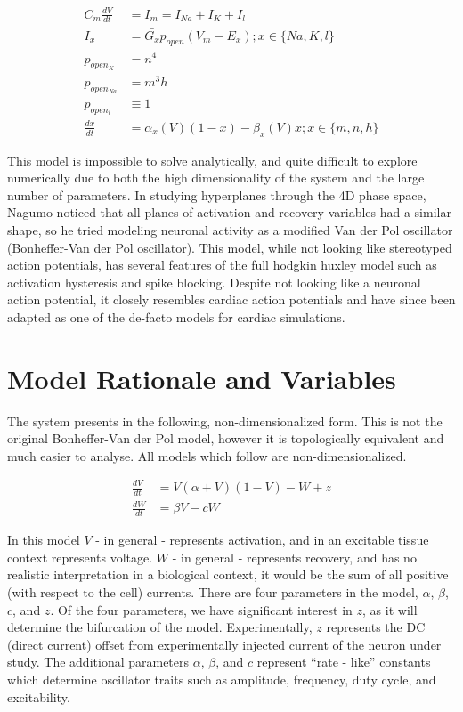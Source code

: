 \documentclass[11pt]{report}
\begin{document}
$$ \begin{aligned} C_m \frac{dV}{dt} &= I_m = I_{Na} + I_{K} + I_l \\ I_x &= \bar{G_x}p_{open}(V_m-E_x); x\in\{Na,K,l\}\\ p_{open_{K}} &= n^4 \\ p_{open_{Na}} &= m^3h\\ p_{open_{l}} &\equiv 1\\ \frac{dx}{dt} &= \alpha_x(V)(1-x)-\beta_x(V)x; x\in \{m,n,h\} \end{aligned} $$

This model is impossible to solve analytically, and quite difficult to explore numerically due to both the high dimensionality of the system and the large number of parameters. In studying hyperplanes through the 4D phase space, Nagumo noticed that all planes of activation and recovery variables had a similar shape, so he tried modeling neuronal activity as a modified Van der Pol oscillator (Bonheffer-Van der Pol oscillator). This model, while not looking like stereotyped action potentials, has several features of the full hodgkin huxley model such as activation hysteresis and spike blocking. Despite not looking like a neuronal action potential, it closely resembles cardiac action potentials and have since been adapted as one of the de-facto models for cardiac simulations. 


\section{Model Rationale and Variables}

The system presents in the following, non-dimensionalized form. This is not the original Bonheffer-Van der Pol model, however it is topologically equivalent and much easier to analyse. All models which follow are non-dimensionalized. 

$$ \begin{aligned} \frac{dV}{dt} &= V(\alpha+V)(1-V) -W + z \\
\frac{dW}{dt} &= \beta V-cW \end{aligned} $$

In this model $V$ - in general - represents activation, and in an excitable tissue context represents voltage. $W$ - in general - represents recovery, and has no realistic interpretation in a biological context, it would be the sum of all positive (with respect to the cell) currents. There are four parameters in the model, $\alpha$, $\beta$, $c$, and $z$. Of the four parameters, we have significant interest in $z$, as it will determine the bifurcation of the model. Experimentally, $z$ represents the DC (direct current) offset from experimentally injected current of the neuron under study. The additional parameters $\alpha$, $\beta$, and $c$ represent ``rate - like'' constants which determine oscillator traits such as amplitude, frequency, duty cycle, and excitability.
\end{document}
